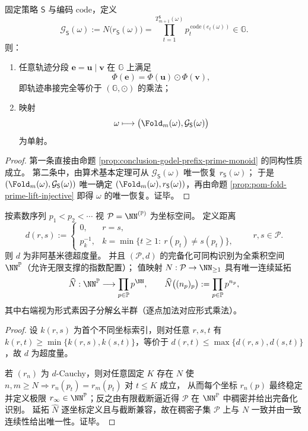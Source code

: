 \begin{theorem}[投影轨迹的整数化代数等价]\label{thm:conclusion-algorithm-prime-shift-equivalence}
固定策略 \(\mathsf S\) 与编码 \(\mathrm{code}\)，定义
\[
\mathcal G_{\mathsf S}(\omega)
:=N\!\bigl(r_{\mathsf S}(\omega)\bigr)
=\prod_{t=1}^{T_{m+1}^{\mathsf S}(\omega)}
p_t^{\,\mathrm{code}(e_t(\omega))}
\in\mathbb G.
\]
则：
\begin{enumerate}
  \item 任意轨迹分段 \(\mathbf e=\mathbf u\mid\mathbf v\) 在 \(\mathbb G\) 上满足
  \[
  \Phi(\mathbf e)=\Phi(\mathbf u)\odot\Phi(\mathbf v),
  \]
  即轨迹串接完全等价于 \((\mathbb G,\odot)\) 的乘法；
  \item 映射
  \[
  \omega\longmapsto \bigl(\Fold_m(\omega),\mathcal G_{\mathsf S}(\omega)\bigr)
  \]
  为单射。
\end{enumerate}
\end{theorem}
\begin{proof}
第一条直接由命题 \ref{prop:conclusion-godel-prefix-prime-monoid} 的同构性质成立。
第二条中，由算术基本定理可从 \(\mathcal G_{\mathsf S}(\omega)\) 唯一恢复
\(
r_{\mathsf S}(\omega)
\)；
于是
\(
(\Fold_m(\omega),\mathcal G_{\mathsf S}(\omega))
\)
唯一确定
\(
(\Fold_m(\omega),r_{\mathsf S}(\omega))
\)，再由命题 \ref{prop:pom-fold-prime-lift-injective} 即得 \(\omega\) 的唯一恢复。证毕。
\end{proof}

\begin{theorem}\label{thm:conclusion-prime-register-ultrametric-completion}
按素数序列 \(p_1<p_2<\cdots\) 视 \(\mathcal P=\NN^{(\mathbb P)}\) 为坐标空间。
定义距离
\[
d(r,s):=
\begin{cases}
0,& r=s,\\[1mm]
p_k^{-1},& k=\min\{t\ge 1:\ r(p_t)\ne s(p_t)\},
\end{cases}
\qquad r,s\in\mathcal P.
\]
则 \(d\) 为非阿基米德超度量。
并且 \((\mathcal P,d)\) 的完备化可同构识别为全乘积空间 \(\NN^{\mathbb P}\)（允许无限支撑的指数配置）；
值映射 \(N:\mathcal P\to\NN_{\ge 1}\) 具有唯一连续延拓
\[
\widehat N:\NN^{\mathbb P}\longrightarrow \prod_{p\in\mathbb P}p^{\NN},\qquad
\widehat N\bigl((n_p)_p\bigr):=\prod_{p\in\mathbb P}p^{n_p},
\]
其中右端视为形式素因子分解幺半群（逐点加法对应形式乘法）。
\end{theorem}
\begin{proof}
设 \(k(r,s)\) 为首个不同坐标索引，则对任意 \(r,s,t\) 有
\(
k(r,t)\ge \min\{k(r,s),k(s,t)\}
\)，等价于
\(
d(r,t)\le \max\{d(r,s),d(s,t)\}
\)，故 \(d\) 为超度量。
\par
若 \((r_n)\) 为 \(d\)-Cauchy，则对任意固定 \(K\) 存在 \(N\) 使 \(n,m\ge N\Rightarrow r_n(p_t)=r_m(p_t)\) 对 \(t\le K\) 成立，
从而每个坐标 \(r_n(p)\) 最终稳定并定义极限 \(r_\infty\in\NN^{\mathbb P}\)；反之由有限截断逼近得 \(\mathcal P\) 在 \(\NN^{\mathbb P}\) 中稠密并给出完备化识别。
延拓 \(\widehat N\) 逐坐标定义且与截断兼容，故在稠密子集 \(\mathcal P\) 上与 \(N\) 一致并由一致连续性给出唯一性。证毕。
\end{proof}

